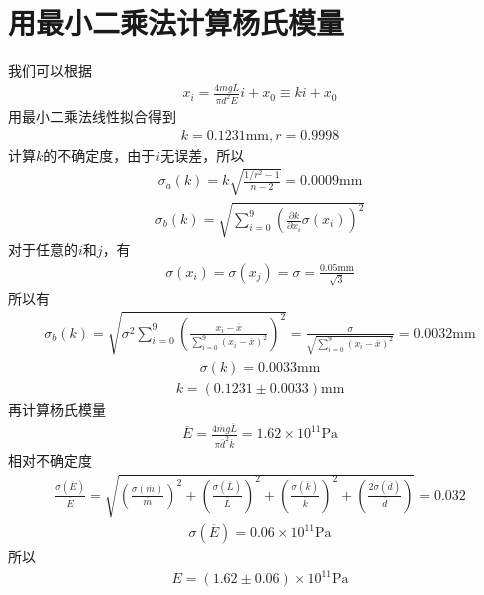 \documentclass[a4paper]{ctexart}
\begin{document}
	\section{用最小二乘法计算杨氏模量}
	\noindent 我们可以根据
	\begin{align}
		x_i=\frac{4mgL}{\pi d^2E}i+x_0\equiv ki+x_0
	\end{align}
	用最小二乘法线性拟合得到
	\begin{align}
		k=0.1231\mathrm{mm},r=0.9998
	\end{align}
	计算$k$的不确定度，由于$i$无误差，所以
	\begin{align}
		\sigma_a(k)=k\sqrt{\frac{1/r^2-1}{n-2}}=0.0009\mathrm{mm}
	\end{align}
	\begin{align}
		\sigma_b(k)=\sqrt{\sum_{i=0}^{9}\left(\frac{\partial k}{\partial x_i}\sigma(x_i)\right)^2}
	\end{align}
	对于任意的$i$和$j$，有
	\begin{align}
		\sigma(x_i)=\sigma(x_j)=\sigma=\frac{0.05\mathrm{mm}}{\sqrt{3}}
	\end{align}
	所以有
	\begin{align}
		\sigma_b(k)=\sqrt{\sigma^2\sum_{i=0}^{9}\left(\frac{x_i-\overline{x}}{\sum_{i=0}^{9}(x_i-\overline{x})^2}\right)^2}=\frac{\sigma}{\sqrt{\sum_{i=0}^{9}(x_i-\overline{x})^2}}=0.0032\mathrm{mm}
	\end{align}
	\begin{align}
		\sigma(k)=0.0033\mathrm{mm}
	\end{align}
	\begin{align}
		k=(0.1231\pm 0.0033)\mathrm{mm}
	\end{align}
	再计算杨氏模量
	\begin{align}
		\overline{E}=\frac{4\overline{m}g\overline{L}}{\pi \overline{d}^2\overline{k}}=1.62\times10^{11}\mathrm{Pa}
	\end{align}
	相对不确定度
	\begin{align}
		\frac{\sigma(\overline{E})}{\overline{E}}=\sqrt{\left(\frac{\sigma(\overline{m})}{\overline{m}}\right)^2+\left(\frac{\sigma(\overline{L})}{\overline{L}}\right)^2+\left(\frac{\sigma(\overline{k})}{\overline{k}}\right)^2+\left(\frac{2\sigma(\overline{d})}{\overline{d}}\right)}=0.032
	\end{align}
	\begin{align}
		\sigma(\overline{E})=0.06\times10^{11}\mathrm{Pa}
	\end{align}
	所以
	\begin{align}
		E=(1.62\pm0.06)\times10^{11}\mathrm{Pa}
	\end{align}
\end{document}
